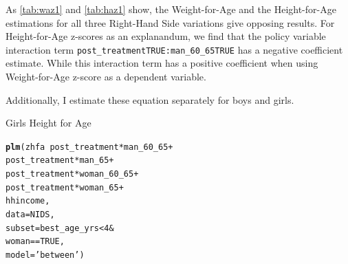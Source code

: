 \documentclass[a4paper,british]{article}\usepackage[]{graphicx}\usepackage[]{color}
\makeatletter
\newcommand{\hlnum}[1]{\textcolor[rgb]{0.686,0.059,0.569}{#1}}%
\newcommand{\hlstr}[1]{\textcolor[rgb]{0.192,0.494,0.8}{#1}}%
\newcommand{\hlopt}[1]{\textcolor[rgb]{0,0,0}{#1}}%
\newcommand{\hlstd}[1]{\textcolor[rgb]{0.345,0.345,0.345}{#1}}%
\newcommand{\hlkwc}[1]{\textcolor[rgb]{0.333,0.667,0.333}{#1}}%
\newcommand{\hlkwd}[1]{\textcolor[rgb]{0.737,0.353,0.396}{\textbf{#1}}}%
\newenvironment{kframe}{%
 \def\at@end@of@kframe{}%
 \ifinner\ifhmode%
  \def\at@end@of@kframe{\end{minipage}}%
  \begin{minipage}{\columnwidth}%
 \fi\fi%
 \def\FrameCommand##1{\hskip\@totalleftmargin \hskip-\fboxsep
 \colorbox{shadecolor}{##1}\hskip-\fboxsep
     \hskip-\linewidth \hskip-\@totalleftmargin \hskip\columnwidth}%
 \MakeFramed {\advance\hsize-\width
   \@totalleftmargin\z@ \linewidth\hsize
   \@setminipage}}%
 {\par\unskip\endMakeFramed%
 \at@end@of@kframe}
\newenvironment{knitrout}{}{} %
\newcommand{\code}[1]{\texttt{#1}}
\let\ref\autoref
\makeatother
\begin{document}
\begin{table}[H]
\begin{knitrout}
\end{knitrout}
\end{table}

As \ref{tab:waz1} and \ref{tab:haz1} show, the Weight-for-Age and
the Height-for-Age estimations for all three Right-Hand Side variations
give opposing results. For Height-for-Age z-scores as an explanandum,
we find that the policy variable interaction term \code{post\_treatmentTRUE:man\_60\_65TRUE}
has a negative coefficient estimate. While this interaction term has
a positive coefficient when using Weight-for-Age z-score as a dependent
variable.

Additionally, I estimate these equation separately for boys and girls.

\begin{table}[H]
\caption{Girls Height for Age}

\begin{knitrout}
\color{fgcolor}\begin{kframe}
\begin{alltt}
\hlkwd{plm}\hlstd{(zhfa} \hlopt{~}      \hlstd{post_treatment}\hlopt{*}\hlstd{man_60_65} \hlopt{+}
                \hlstd{post_treatment}\hlopt{*}\hlstd{man_65} \hlopt{+}
                \hlstd{post_treatment}\hlopt{*}\hlstd{woman_60_65} \hlopt{+}
                \hlstd{post_treatment}\hlopt{*}\hlstd{woman_65} \hlopt{+}
                \hlstd{hhincome,}
                \hlkwc{data} \hlstd{= NIDS,}
                \hlkwc{subset} \hlstd{= best_age_yrs} \hlopt{<} \hlnum{4} \hlopt{&}
                \hlstd{woman} \hlopt{==} \hlnum{TRUE}\hlstd{,}
                \hlkwc{model}\hlstd{=}\hlstr{'between'}\hlstd{)}
\end{alltt}
\end{kframe}
\end{knitrout}


\end{table}
\end{document}
